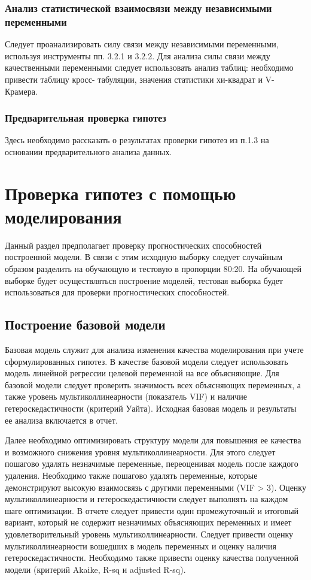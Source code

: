 \documentclass[12pt]{article}
\begin{document}
\subsubsection{Анализ статистической взаимосвязи между независимыми переменными}

Следует проанализировать силу связи между независимыми переменными,
используя инструменты пп. 3.2.1 и 3.2.2. Для анализа силы связи между качественными
переменными следует использовать анализ таблиц: необходимо привести таблицу кросс-
табуляции, значения статистики хи-квадрат и V-Крамера.

\subsubsection{Предварительная проверка гипотез}
Здесь необходимо рассказать о результатах проверки гипотез из п.1.3 на основании
предварительного анализа данных.

\section{Проверка гипотез с помощью моделирования}
Данный раздел предполагает проверку прогностических способностей построенной
модели. В связи с этим исходную выборку следует случайным образом разделить на
обучающую и тестовую в пропорции 80:20. На обучающей выборке будет осуществляться
построение моделей, тестовая выборка будет использоваться для проверки
прогностических способностей.

\subsection{Построение базовой модели}
Базовая модель служит для анализа изменения качества моделирования при учете
сформулированных гипотез. В качестве базовой модели следует использовать модель
линейной регрессии целевой переменной на все объясняющие. Для базовой модели
следует проверить значимость всех объясняющих переменных, а также уровень
мультиколлинеарности (показатель VIF) и наличие гетероскедастичности (критерий Уайта).
Исходная базовая модель и результаты ее анализа включается в отчет.

Далее необходимо оптимизировать структуру модели для повышения ее качества и
возможного снижения уровня мультиколлинеарности. Для этого следует пошагово удалять
незначимые переменные, переоценивая модель после каждого удаления. Необходимо
также пошагово удалять переменные, которые демонстрируют высокую взаимосвязь с
другими переменными (VIF > 3). Оценку мультиколлинеарности и гетероскедастичности
следует выполнять на каждом шаге оптимизации. В отчете следует привести один
промежуточный и итоговый вариант, который не содержит незначимых объясняющих
переменных и имеет удовлетворительный уровень мультиколлинеарности. Следует
привести оценку мультиколлинеарности вошедших в модель переменных и оценку
наличия гетероскедастичности. Необходимо также привести оценку качества полученной
модели (критерий Akaike, R-sq и adjusted R-sq).
\end{document}
